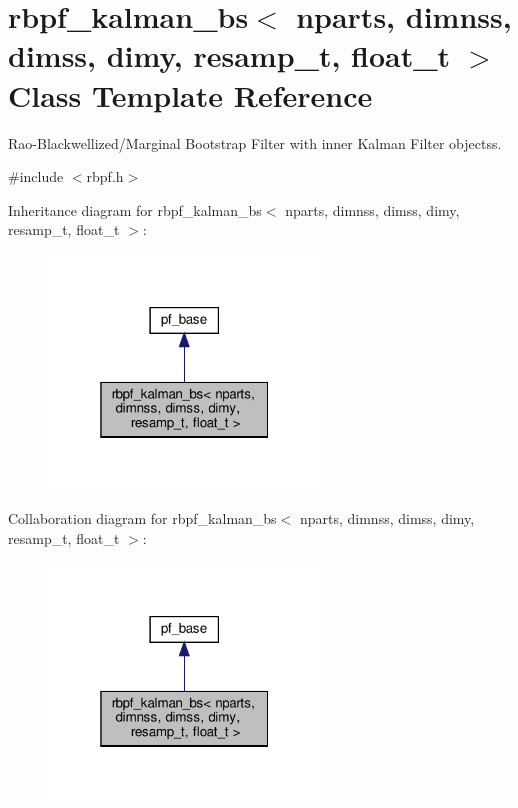 \hypertarget{classrbpf__kalman__bs}{}\section{rbpf\+\_\+kalman\+\_\+bs$<$ nparts, dimnss, dimss, dimy, resamp\+\_\+t, float\+\_\+t $>$ Class Template Reference}
\label{classrbpf__kalman__bs}


Rao-\/\+Blackwellized/\+Marginal Bootstrap Filter with inner Kalman Filter objectss.  




{\ttfamily \#include $<$rbpf.\+h$>$}



Inheritance diagram for rbpf\+\_\+kalman\+\_\+bs$<$ nparts, dimnss, dimss, dimy, resamp\+\_\+t, float\+\_\+t $>$\+:
\nopagebreak
\begin{figure}[H]
\begin{center}
\leavevmode
\includegraphics[width=205pt]{classrbpf__kalman__bs__inherit__graph}
\end{center}
\end{figure}


Collaboration diagram for rbpf\+\_\+kalman\+\_\+bs$<$ nparts, dimnss, dimss, dimy, resamp\+\_\+t, float\+\_\+t $>$\+:
\nopagebreak
\begin{figure}[H]
\begin{center}
\leavevmode
\includegraphics[width=205pt]{classrbpf__kalman__bs__coll__graph}
\end{center}
\end{figure}
